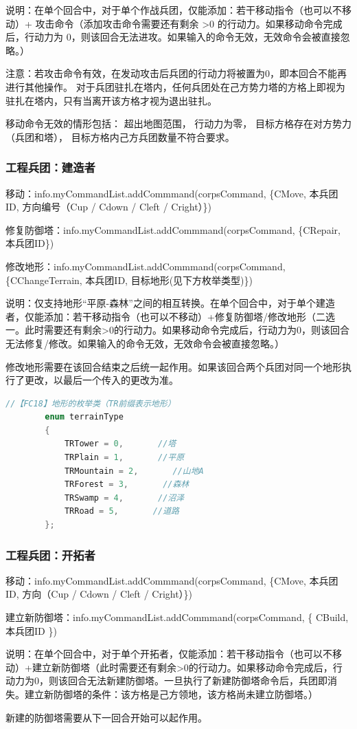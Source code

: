 \documentclass[a4paper,4pt]{article}
\begin{document}
说明：在单个回合中，对于单个作战兵团，仅能添加：若干移动指令（也可以不移动）+ 攻击命令（添加攻击命令需要还有剩余 >0 的行动力。如果移动命令完成后，行动力为 0，则该回合无法进攻。如果输入的命令无效，无效命令会被直接忽略。）

注意：若攻击命令有效，在发动攻击后兵团的行动力将被置为0，即本回合不能再进行其他操作。
对于兵团驻扎在塔内，任何兵团处在己方势力塔的方格上即视为驻扎在塔内，只有当离开该方格才视为退出驻扎。\par

移动命令无效的情形包括：
超出地图范围，
行动力为零，
目标方格存在对方势力（兵团和塔），
目标方格内己方兵团数量不符合要求。
\subsubsection{工程兵团：建造者}
移动：info.myCommandList.addCommmand(corpsCommand, \{CMove, 本兵团ID, 方向编号（Cup / Cdown / Cleft / Cright）\})\par
修复防御塔：info.myCommandList.addCommmand(corpsCommand, \{CRepair, 本兵团ID\})\par
修改地形：info.myCommandList.addCommmand(corpsCommand, \{CChangeTerrain, 本兵团ID, 目标地形(见下方枚举类型)\})\par
说明：仅支持地形“平原-森林”之间的相互转换。在单个回合中，对于单个建造者，仅能添加：若干移动指令（也可以不移动）+修复防御塔/修改地形（二选一。此时需要还有剩余>0的行动力。如果移动命令完成后，行动力为0，则该回合无法修复/修改。如果输入的命令无效，无效命令会被直接忽略。）\par
修改地形需要在该回合结束之后统一起作用。如果该回合两个兵团对同一个地形执行了更改，以最后一个传入的更改为准。
\begin{lstlisting}[language={C++},title={生产任务类型}]  %插入代码块
		//【FC18】地形的枚举类（TR前缀表示地形）
		enum terrainType
		{
			TRTower = 0,       //塔
			TRPlain = 1,       //平原
			TRMountain = 2,       //山地A
			TRForest = 3,       //森林
			TRSwamp = 4,       //沼泽
			TRRoad = 5,       //道路
		};
\end{lstlisting}
\subsubsection{工程兵团：开拓者}
移动：info.myCommandList.addCommmand(corpsCommand, \{CMove, 本兵团ID, 方向（Cup / Cdown / Cleft / Cright）\})\par
建立新防御塔：info.myCommandList.addCommmand(corpsCommand, \{ CBuild, 本兵团ID \})\par
说明：在单个回合中，对于单个开拓者，仅能添加：若干移动指令（也可以不移动）+建立新防御塔（此时需要还有剩余>0的行动力。如果移动命令完成后，行动力为0，则该回合无法新建防御塔。一旦执行了新建防御塔命令后，兵团即消失。建立新防御塔的条件：该方格是己方领地，该方格尚未建立防御塔。）\par
新建的防御塔需要从下一回合开始可以起作用。
\end{document}

